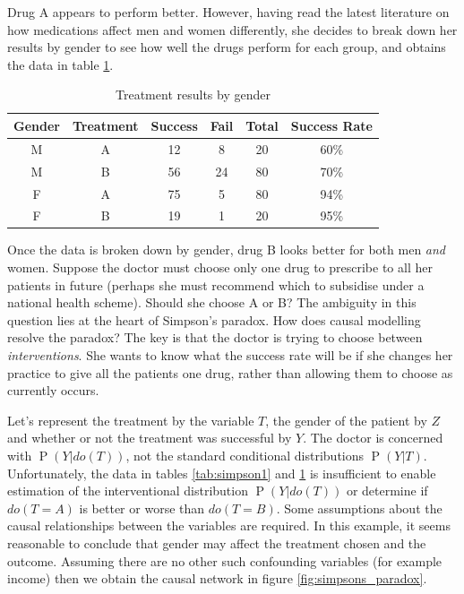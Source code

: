 \documentclass[11pt,a4paper,twoside]{report}
\renewcommand{\P}[1]{\operatorname{P}\left(#1\right)}
\theoremstyle{plain}
\theoremstyle{definition}
\begin{document}
Drug A appears to perform better. However, having read the latest literature on how medications affect men and women differently, she decides to break down her results by gender to see how well the drugs perform for each group, and obtains the data in table \ref{tab:simpson2}.

\begin{table}[ht]
\caption{Treatment results by gender}
\label{tab:simpson2}
\center
\begin{tabular}{c c c c c c}
Gender & Treatment & Success & Fail & Total & Success Rate\\
\hline
\rowcolor[gray]{0.9}
M & A & 12 & 8 & 20 & 60\%\\
M & B & 56 & 24 & 80 & 70\%\\
\rowcolor[gray]{0.9}
F & A & 75 & 5 & 80 & 94\%\\
F & B & 19 & 1 & 20 & 95\%\\
\hline
\end{tabular}
\end{table}

Once the data is broken down by gender, drug B looks better for both men \emph{and} women. Suppose the doctor must choose only one drug to prescribe to all her patients in future (perhaps she must recommend which to subsidise under a national health scheme). Should she choose A or B? The ambiguity in this question lies at the heart of Simpson's paradox. How does causal modelling resolve the paradox? The key is that the doctor is trying to choose between \emph{interventions}. She wants to know what the success rate will be if she changes her practice to give all the patients one drug, rather than allowing them to choose as currently occurs. 

Let's represent the treatment by the variable $T$, the gender of the patient by $Z$ and whether or not the treatment was successful by $Y$. The doctor is concerned with $\P{Y|do(T)}$, not the standard conditional distributions $\P{Y|T}$. Unfortunately, the data in tables \ref{tab:simpson1} and \ref{tab:simpson2} is insufficient to enable estimation of the interventional distribution $\P{Y|do(T)}$ or determine if $do(T=A)$ is better or worse than $do(T=B)$. Some assumptions about the causal relationships between the variables are required. In this example, it seems reasonable to conclude that gender may affect the treatment chosen and the outcome. Assuming there are no other such confounding variables (for example income) then we obtain the causal network in figure \ref{fig:simpsons_paradox}.
\end{document}
